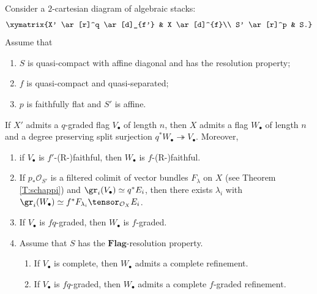 \documentclass[reqno,a4paper]{amsart}
\numberwithin{Theorem}{section}
\newcommand{\Orb}{\mathcal{O}}
\newcommand{\Flag}{\mathbf{Flag}}
\theoremstyle{plain}
\theoremstyle{remark}
\begin{document}
\begin{Theorem}\label{T:descent-flags}
  Consider a $2$-cartesian diagram of algebraic stacks:
  \[
    \xymatrix{X' \ar[r]^q \ar[d]_{f'} & X \ar[d]^{f}\\ S' \ar[r]^p & S.}
  \]
  Assume that
  \begin{enumerate}
  \item $S$ is quasi-compact with affine diagonal and has the resolution property;
  \item $f$ is quasi-compact and quasi-separated;  
  \item $p$ is faithfully flat and $S'$ is affine.
  \end{enumerate}
  If $X'$ admits a $q$-graded flag $V_\bullet$ of length $n$, then $X$
  admits a flag $W_\bullet$ of length $n$ and a degree preserving
  split surjection $q^*W_\bullet \twoheadrightarrow
  V_\bullet$. Moreover,
  \begin{enumerate}[label=(\alph*)]
  \item \label{TI:descent-flags:faithful} if
    $V_\bullet$ is $f'$-(R-)faithful, then $W_\bullet$ is
    $f$-(R-)faithful. 
  \item \label{TI:descent-flags:explicit} If
    $p_*\Orb_{S'}$ is a filtered colimit of vector bundles $F_\lambda$ on $X$ (see Theorem \ref{T:schappi}) and
    $\gr_i(V_\bullet) \simeq q^*E_i$, then there exists $\lambda_i$
    with
    $\gr_i(W_\bullet) \simeq f^*F_{\lambda_i}\tensor_{\Orb_X} E_i$.
  \item \label{TI:descent-flags:trivial} If $V_\bullet$ is
    $fq$-graded, then $W_\bullet$ is $f$-graded.
  \item \label{TI:descent-flags:complete} Assume that $S$ has the
    $\Flag$-resolution property.
    \begin{enumerate}[label=(\roman*)]
    \item If $V_\bullet$ is complete, then
      $W_\bullet$ admits a complete refinement.
    \item If $V_\bullet$ is $fq$-graded, then $W_\bullet$ admits a
      complete $f$-graded refinement.
  \end{enumerate}
\end{enumerate}
\end{Theorem}
\end{document}

